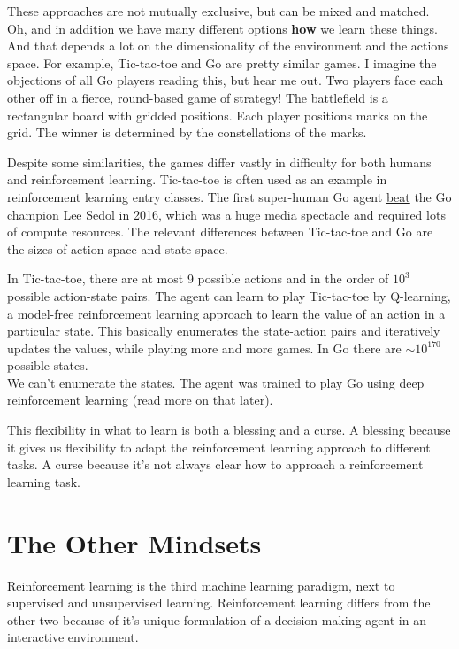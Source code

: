 \documentclass[
  10pt,
]{scrbook}
\begin{document}
These approaches are not mutually exclusive, but can be mixed and matched.
Oh, and in addition we have many different options \textbf{how} we learn these things.
And that depends a lot on the dimensionality of the environment and the actions space.
For example, Tic-tac-toe and Go are pretty similar games.
I imagine the objections of all Go players reading this, but hear me out.
Two players face each other off in a fierce, round-based game of strategy!
The battlefield is a rectangular board with gridded positions.
Each player positions marks on the grid.
The winner is determined by the constellations of the marks.

Despite some similarities, the games differ vastly in difficulty for both humans and reinforcement learning.
Tic-tac-toe is often used as an example in reinforcement learning entry classes.
The first super-human Go agent \href{https://en.wikipedia.org/wiki/AlphaGo_versus_Lee_Sedol}{beat} the Go champion Lee Sedol in 2016, which was a huge media spectacle and required lots of compute resources.
The relevant differences between Tic-tac-toe and Go are the sizes of action space and state space.

In Tic-tac-toe, there are at most 9 possible actions and in the order of \(10^3\) possible action-state pairs.
The agent can learn to play Tic-tac-toe by Q-learning, a model-free reinforcement learning approach to learn the value of an action in a particular state.
This basically enumerates the state-action pairs and iteratively updates the values, while playing more and more games.
In Go there are \(\sim 10^{170}\) possible states.\\
We can't enumerate the states.
The agent was trained to play Go using deep reinforcement learning (read more on that later).

This flexibility in what to learn is both a blessing and a curse.
A blessing because it gives us flexibility to adapt the reinforcement learning approach to different tasks.
A curse because it's not always clear how to approach a reinforcement learning task.

\hypertarget{the-other-mindsets}{%
\section{The Other Mindsets}\label{the-other-mindsets}}

Reinforcement learning is the third machine learning paradigm, next to supervised and unsupervised learning.
Reinforcement learning differs from the other two because of it's unique formulation of a decision-making agent in an interactive environment.
\end{document}
